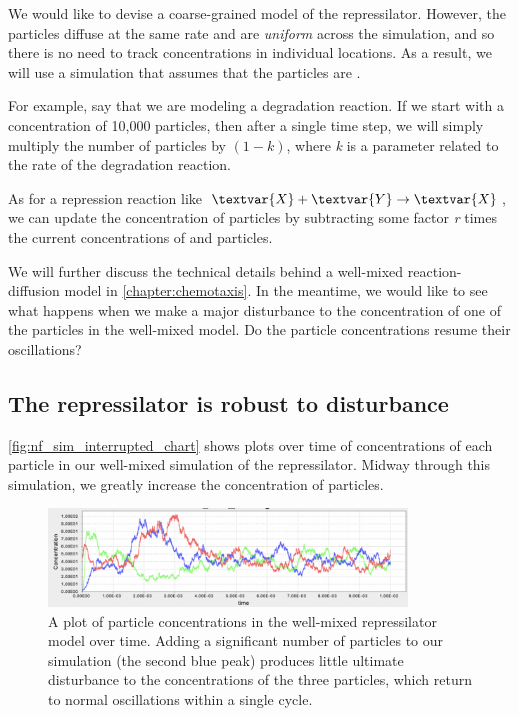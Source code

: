 We would like to devise a coarse-grained model of the repressilator. However, the particles diffuse at the same rate and are \textit{uniform} across the simulation, and so there is no need to track concentrations in individual locations. As a result, we will use a simulation that assumes that the particles are .

For example, say that we are modeling a degradation reaction. If we start with a concentration of 10,000  particles, then after a single time step, we will simply multiply the number of  particles by $(1-k)$, where \textit{k} is a parameter related to the rate of the degradation reaction.

As for a repression reaction like $\textvar{X} + \textvar{Y} \rightarrow \textvar{X}$, we can update the concentration of  particles by subtracting some factor \textit{r} times the current concentrations of  and  particles.

We will further discuss the technical details behind a well-mixed reaction-diffusion model in \autoref{chapter:chemotaxis}. In the meantime, we would like to see what happens when we make a major disturbance to the concentration of one of the particles in the well-mixed model. Do the particle concentrations resume their oscillations?

\FloatBarrier
{}
\subsection{The repressilator is robust to disturbance}

\autoref{fig:nf_sim_interrupted_chart} shows plots over time of concentrations of each particle in our well-mixed simulation of the repressilator.  Midway through this simulation, we greatly increase the concentration of  particles.

\begin{figure}[h]
\centering
\mySfFamily
\includegraphics[width = 0.85\textwidth]{../images/nf_sim_interrupted_chart.png}
\caption{A plot of particle concentrations in the well-mixed repressilator model over time. Adding a significant number of  particles to our simulation (the second blue peak) produces little ultimate disturbance to the concentrations of the three particles, which return to normal oscillations within a single cycle.}
\label{fig:nf_sim_interrupted_chart}
\end{figure}

